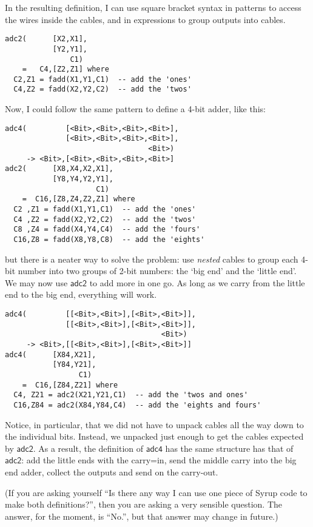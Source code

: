 \documentclass{article}
\newcommand{\C}{\mathsf}
\begin{document}
In the resulting definition, I can use square bracket syntax in
patterns to access the wires inside the cables, and in expressions
to group outputs into cables.
\begin{verbatim}
adc2(      [X2,X1],
           [Y2,Y1],
               C1)
    =   C4,[Z2,Z1] where
  C2,Z1 = fadd(X1,Y1,C1)  -- add the 'ones'
  C4,Z2 = fadd(X2,Y2,C2)  -- add the 'twos'
\end{verbatim}

Now, I could follow the same pattern to define a 4-bit adder, like
this:
\begin{verbatim}
adc4(         [<Bit>,<Bit>,<Bit>,<Bit>],
              [<Bit>,<Bit>,<Bit>,<Bit>],
                                 <Bit>)
     -> <Bit>,[<Bit>,<Bit>,<Bit>,<Bit>]
adc2(      [X8,X4,X2,X1],
           [Y8,Y4,Y2,Y1],
                     C1)
    =  C16,[Z8,Z4,Z2,Z1] where
  C2 ,Z1 = fadd(X1,Y1,C1)  -- add the 'ones'
  C4 ,Z2 = fadd(X2,Y2,C2)  -- add the 'twos'
  C8 ,Z4 = fadd(X4,Y4,C4)  -- add the 'fours'
  C16,Z8 = fadd(X8,Y8,C8)  -- add the 'eights'
\end{verbatim}
but there is a neater way to solve the problem: use \emph{nested}
cables to group each 4-bit number into two groups of 2-bit numbers:
the `big end' and the `little end'. We may now use $\C{adc2}$ to
add more in one go. As long as we carry from the little end to the
big end, everything will work.
\begin{verbatim}
adc4(         [[<Bit>,<Bit>],[<Bit>,<Bit>]],
              [[<Bit>,<Bit>],[<Bit>,<Bit>]],
                                    <Bit>)
     -> <Bit>,[[<Bit>,<Bit>],[<Bit>,<Bit>]]
adc4(      [X84,X21],
           [Y84,Y21],
                 C1)
    =  C16,[Z84,Z21] where
  C4, Z21 = adc2(X21,Y21,C1)  -- add the 'twos and ones'
  C16,Z84 = adc2(X84,Y84,C4)  -- add the 'eights and fours'
\end{verbatim}
Notice, in particular, that we did not have to unpack cables all
the way down to the individual bits. Instead, we unpacked just
enough to get the cables expected by $\C{adc2}$. As a result,
the definition of $\C{adc4}$ has the same structure has that of
$\C{adc2}$: add the little ends with the carry=in, send the middle carry
into the big end adder, collect the outputs and send on the carry-out.

(If you are asking yourself ``Is there any way I can use one piece
of Syrup code to make both definitions?'', then you are asking a very
sensible question. The answer, for the moment, is ``No.'', but that
answer may change in future.)
\end{document}
